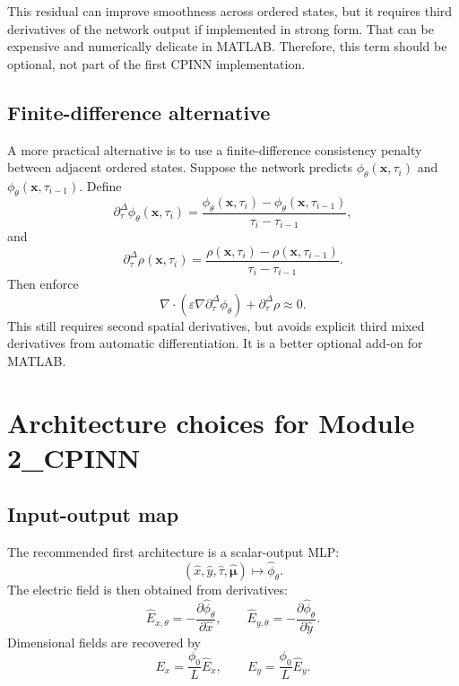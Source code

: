 \documentclass[11pt]{article}
\newcommand{\xv}{\bm{x}}
\newcommand{\muv}{\bm{\mu}}
\newcommand{\phinn}{\phi_{\theta}}
\newcommand{\taud}{\tau}
\begin{document}
This residual can improve smoothness across ordered states, but it requires third derivatives of the network output if implemented in strong form. That can be expensive and numerically delicate in MATLAB. Therefore, this term should be optional, not part of the first CPINN implementation.

\subsection{Finite-difference alternative}

A more practical alternative is to use a finite-difference consistency penalty between adjacent ordered states. Suppose the network predicts $\phinn(\xv,\taud_i)$ and $\phinn(\xv,\taud_{i-1})$. Define
\begin{equation}
\partial_{\taud}^{\Delta}\phinn(\xv,\taud_i)
=\frac{\phinn(\xv,\taud_i)-\phinn(\xv,\taud_{i-1})}{\taud_i-\taud_{i-1}},
\end{equation}
and
\begin{equation}
\partial_{\taud}^{\Delta}\rho(\xv,\taud_i)
=\frac{\rho(\xv,\taud_i)-\rho(\xv,\taud_{i-1})}{\taud_i-\taud_{i-1}}.
\end{equation}
Then enforce
\begin{equation}
\nabla\cdot\left(\varepsilon\nabla\partial_{\taud}^{\Delta}\phinn\right)
+\partial_{\taud}^{\Delta}\rho\approx 0.
\label{eq:finite_difference_sensitivity}
\end{equation}
This still requires second spatial derivatives, but avoids explicit third mixed derivatives from automatic differentiation. It is a better optional add-on for MATLAB.

\section{Architecture choices for Module 2\_CPINN}

\subsection{Input-output map}

The recommended first architecture is a scalar-output MLP:
\begin{equation}
(\hat{x},\hat{y},\hat{\taud},\hat{\muv})\longmapsto \hat{\phi}_{\theta}.
\label{eq:cpinn_io_map}
\end{equation}
The electric field is then obtained from derivatives:
\begin{equation}
\hat{E}_{x,\theta}=-\frac{\partial\hat{\phi}_{\theta}}{\partial\hat{x}},
\qquad
\hat{E}_{y,\theta}=-\frac{\partial\hat{\phi}_{\theta}}{\partial\hat{y}}.
\end{equation}
Dimensional fields are recovered by
\begin{equation}
E_x=\frac{\phi_0}{L}\hat{E}_x,
\qquad
E_y=\frac{\phi_0}{L}\hat{E}_y.
\end{equation}
\end{document}
